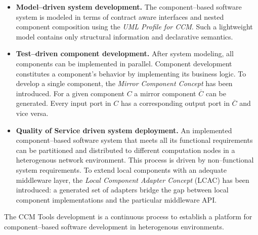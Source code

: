 \begin{itemize}
\item {\bf Model--driven system development.} 
The component--based software system is modeled in terms of contract aware
interfaces and nested component composition using the {\it UML Profile for CCM}.
Such a lightweight model contains only structural information and declarative 
semantics.

\item {\bf Test--driven component development.} 
After system modeling, all components can be implemented in parallel.
Component development constitutes a component's behavior by implementing its 
business logic.
To develop a single component, the 
{\it Mirror Component Concept} has been introduced.
For a given component $C$ a mirror component $\overline{C}$ can be generated.
Every input port in $C$ has a corresponding output port in $\overline{C}$ and 
vice versa.

\item {\bf Quality of Service driven system deployment.} 
An implemented component--based software system that meets all its functional
requirements can be partitioned and distributed to different computation nodes
in a heterogenous network environment.
This process is driven by non--functional system requirements.
To extend local components with an adequate middleware layer, the 
{\it Local Component Adapter Concept} (LCAC)
has been introduced: a generated set of
adapters bridge the gap between local component implementations and
the particular middleware API.
\end{itemize}

The CCM Tools development is a continuous process to establish a 
platform for component--based software development in heterogenous environments.

